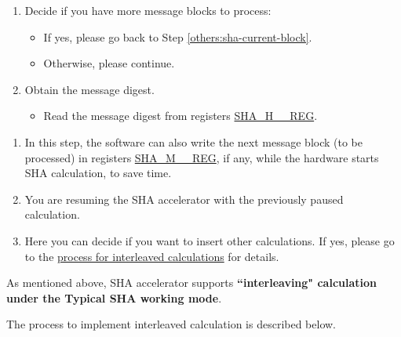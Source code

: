 \documentclass[main\_\_EN.tex]{subfiles}
\begin{document}
\begin{enumerate}
    \item Decide if you have more message blocks to process:
    \begin{itemize}
        \item If yes, please go back to Step \ref{others:sha-current-block}.
        \item Otherwise, please continue.
    \end{itemize}

    \item Obtain the message digest.
    \begin{itemize}
        \item Read the message digest from registers \hyperref[regdesc:SHAHNREG]{SHA\_H\_\_REG}.
    \end{itemize}
\end{enumerate}

\begin{tiplisting}\label{others:sha-note-typical-sha}
\vspace{-2.5em}
\begin{enumerate}
\item In this step, the software can also write the next message block (to be processed) in registers \hyperref[regdesc:SHAMNREG]{SHA\_M\_\_REG}, if any, while the hardware starts SHA calculation, to save time.
\item You are resuming the SHA accelerator with the previously paused calculation.
\item Here you can decide if you want to insert other calculations. If yes, please go to the \hyperref[others:sha-interleaved]{process for interleaved calculations} for details.
\end{enumerate}
\end{tiplisting}

\label{others:sha-interleaved}As mentioned above, \chipname{} SHA accelerator supports \textbf{``interleaving" calculation under the Typical SHA working mode}.

The process to implement interleaved calculation is described below.
\end{document}
